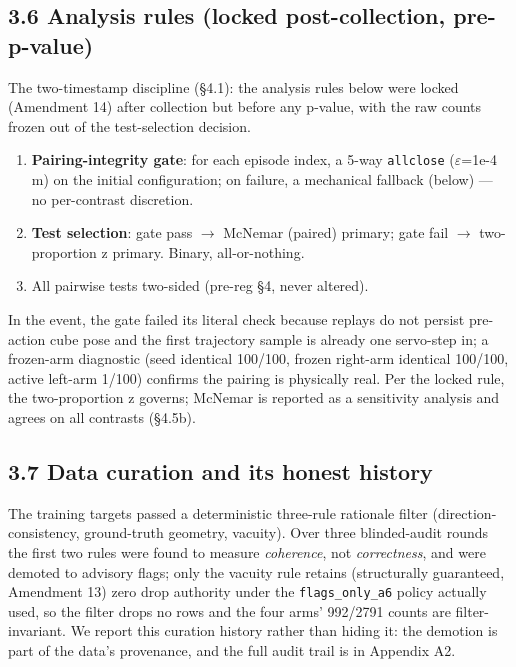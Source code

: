 \subsection*{3.6 Analysis rules (locked post-collection, pre-p-value)}

The two-timestamp discipline (\S4.1): the analysis rules below were
locked (Amendment 14) after collection but before any p-value, with the
raw counts frozen out of the test-selection decision.

\begin{enumerate}
\item \textbf{Pairing-integrity gate}: for each episode index, a 5-way
   \texttt{allclose} ($\varepsilon$=1e-4 m) on the initial configuration; on failure, a
   mechanical fallback (below) --- no per-contrast discretion.
\item \textbf{Test selection}: gate pass $\rightarrow$ McNemar (paired) primary; gate fail
   $\rightarrow$ two-proportion z primary. Binary, all-or-nothing.
\item All pairwise tests two-sided (pre-reg \S4, never altered).
\end{enumerate}

In the event, the gate failed its literal check because replays do not
persist pre-action cube pose and the first trajectory sample is already
one servo-step in; a frozen-arm diagnostic (seed identical 100/100,
frozen right-arm identical 100/100, active left-arm 1/100) confirms the
pairing is physically real. Per the locked rule, the two-proportion z
governs; McNemar is reported as a sensitivity analysis and agrees on
all contrasts (\S4.5b).

\subsection*{3.7 Data curation and its honest history}

The training targets passed a deterministic three-rule rationale
filter (direction-consistency, ground-truth geometry, vacuity). Over
three blinded-audit rounds the first two rules were found to measure
\emph{coherence}, not \emph{correctness}, and were demoted to advisory flags;
only the vacuity rule retains (structurally guaranteed, Amendment 13)
zero drop authority under the \texttt{flags\_only\_a6} policy actually used, so
the filter drops no rows and the four arms' 992/2791 counts are
filter-invariant. We report this curation history rather than hiding
it: the demotion is part of the data's provenance, and the full audit
trail is in Appendix A2.

